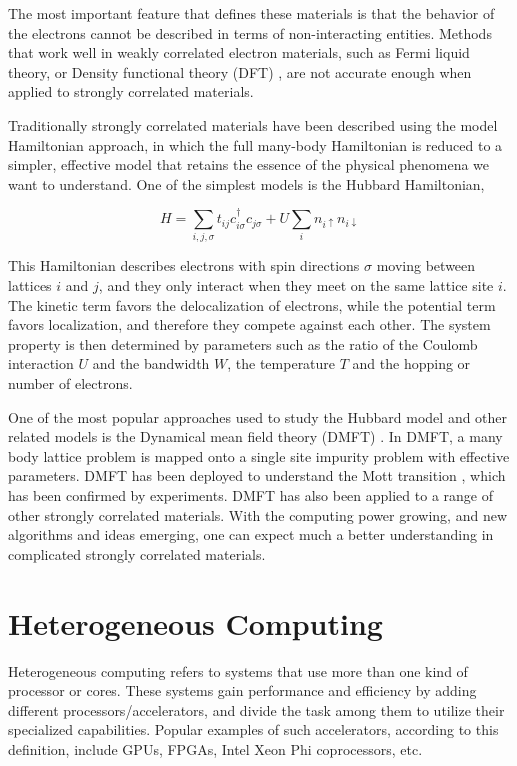The most important feature that defines these materials is that the behavior of the electrons
cannot be described in terms of non-interacting entities. Methods that work well
in weakly correlated electron materials, such as Fermi liquid theory, or Density
functional theory (DFT) \cite{RevModPhys.61.689}, are not accurate enough when applied to strongly 
correlated materials. 

Traditionally strongly correlated materials have been described using the model Hamiltonian 
approach, in which the full many-body Hamiltonian is reduced to a simpler, effective
model that retains the essence of the physical phenomena we want to understand.
One of the simplest models is the Hubbard Hamiltonian, 

\begin{equation}
  \label{eq:13}
  H=\sum_{i,j,\sigma}t_{ij}c_{i\sigma}^\dagger c_{j\sigma} + U\sum_i n_{i\uparrow} n_{i\downarrow}
\end{equation}

This Hamiltonian describes electrons with spin directions $\sigma$ moving between 
lattices $i$ and $j$, and they only interact when they meet on the same lattice 
site $i$. The kinetic term favors the delocalization of electrons, while the 
potential term favors localization, and therefore they compete against each
other. The system property is then determined by parameters such as the ratio of
the Coulomb interaction $U$ and the bandwidth $W$, the temperature $T$ and the 
hopping or number of electrons. 

One of the most popular approaches used to study the Hubbard model and other related
models is the Dynamical mean field theory (DMFT)
\cite{PhysRevB.45.6479,PhysRevLett.69.168,RevModPhys.68.13,PhysRevLett.69.1236,PhysRevLett.69.1240}. 
In DMFT, a many body lattice
problem is mapped onto a single site impurity problem with effective parameters.
DMFT has been deployed to understand the Mott transition 
\cite{PhysRevLett.69.1796,PhysRevLett.70.1666,PhysRevB.48.7167},
which has been confirmed
by experiments\cite{PhysRevLett.75.105,PhysRevB.58.3690,PhysRevLett.90.186403}. 
DMFT has also been applied to a range of other strongly correlated 
materials. With the computing power growing, and new algorithms and ideas emerging, 
one can expect much a better understanding in complicated strongly correlated 
materials.

\section{Heterogeneous Computing}
Heterogeneous computing refers to systems that use more than one kind of 
processor or cores. These systems gain performance and efficiency by adding
different processors/accelerators, and divide the task among them to utilize 
their specialized capabilities. 
Popular examples of such accelerators, according to this definition, include 
GPUs, FPGAs, Intel Xeon Phi coprocessors, etc.


